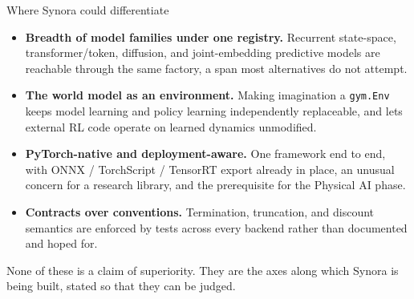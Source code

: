 \documentclass[10pt,a4paper]{article}
\newcommand{\sectionhead}[1]{\vspace{1mm}{\large\displayfont\color{ink} #1}\par\vspace{2mm}}
\newcommand{\subhead}[1]{{\displayfont\color{ink} #1}\par\vspace{1mm}}
\begin{document}
\vspace{4mm}
\begin{callout}
{\footnotesize
\subhead{Where Synora could differentiate}
\begin{itemize}
  \item \textbf{Breadth of model families under one registry.} Recurrent state-space, transformer/token, diffusion, and joint-embedding predictive models are reachable through the same factory, a span most alternatives do not attempt.
  \item \textbf{The world model as an environment.} Making imagination a \texttt{gym.Env} keeps model learning and policy learning independently replaceable, and lets external RL code operate on learned dynamics unmodified.
  \item \textbf{PyTorch-native and deployment-aware.} One framework end to end, with ONNX / TorchScript / TensorRT export already in place, an unusual concern for a research library, and the prerequisite for the Physical AI phase.
  \item \textbf{Contracts over conventions.} Termination, truncation, and discount semantics are enforced by tests across every backend rather than documented and hoped for.
\end{itemize}
\vspace{1mm}
None of these is a claim of superiority. They are the axes along which Synora is being built, stated so that they can be judged.}
\end{callout}

\vspace{4mm}
\sectionhead{References}
\end{document}
